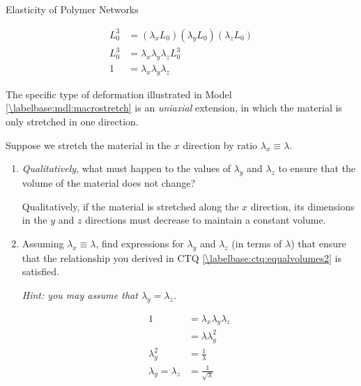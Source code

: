 \begin{activity}{Elasticity of Polymer Networks}
\begin{ctqs}
\begin{enumerate}
		\begin{solution}[1.5in]{}
			\begin{align*}
				L_0^3 &= (\lambda_x L_0)(\lambda_y L_0)(\lambda_z L_0) \\
				L_0^3 & = \lambda_x \lambda_y \lambda_z L_0^3 \\
				1 &= \lambda_x \lambda_y \lambda_z
			\end{align*}
		\end{solution}
		
		\end{enumerate}
		
	\question The specific type of deformation illustrated in Model \ref{\labelbase:mdl:macrostretch} is an \emph{uniaxial} extension, in which the material is only stretched in one direction.
	
		Suppose we stretch the material in the $x$ direction by ratio $\lambda_x \equiv \lambda$.  
		
			\begin{enumerate}
				\item \emph{Qualitatively}, what must happen to the values of $\lambda_y$ and $\lambda_z$ to ensure that the volume of the material does not change?
				
					\begin{solution}[1in]{}
						Qualitatively, if the material is stretched along the $x$ direction, its dimensions in the $y$ and $z$ directions must decrease to maintain a constant volume.
					\end{solution}
				
				\item Assuming $\lambda_x \equiv \lambda$, find expressions for $\lambda_y$ and $\lambda_z$ (in terms of $\lambda$) that ensure that the relationship you derived in CTQ \ref{\labelbase:ctq:equalvolumes2} is satisfied.
		
				\emph{Hint: you may assume that $\lambda_y = \lambda_z$.}
				
					\begin{solution}[1.5in]{}
						\begin{align*}
							1 &= \lambda_x \lambda_y \lambda_z\\
							&= \lambda \lambda_y^2 \\
							\lambda_y^2 &= \frac{1}{\lambda}\\
							\lambda_y = \lambda_z &= \frac{1}{\sqrt{\lambda}}
						\end{align*}
					\end{solution}
				

\end{enumerate}
\end{ctqs}
\end{activity}
